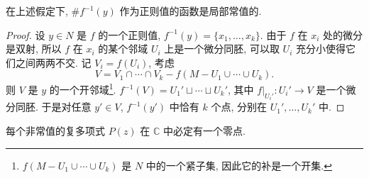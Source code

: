 \documentclass[12pt,a4paper]{article}
\begin{document}
\begin{proposition}
    在上述假定下, $\#f^{-1}(y)$ 作为正则值的函数是局部常值的.
\end{proposition}
\begin{proof}
    设 $y\in N$ 是 $f$ 的一个正则值, $f^{-1}(y) = \{x_1,\dots,x_k\}$. 由于 $f$ 在 $x_i$ 处的微分是双射, 
    所以 $f$ 在 $x_i$ 的某个邻域 $U_i$ 上是一个微分同胚, 可以取 $U_i$ 充分小使得它们之间两两不交. 
    记 $V_i = f(U_i)$, 考虑 
    \begin{equation*}
        V = V_1\cap\cdots\cap V_k - f(M-U_1\cup\cdots\cup U_k).
    \end{equation*}
    则 $V$ 是 $y$ 的一个开邻域\footnote{$f(M-U_1\cup\cdots\cup U_k)$ 是 $N$ 中的一个紧子集, 因此它的补是一个开集.}. 
    $f^{-1}(V) = U_1'\sqcup\cdots\sqcup U_k'$, 其中 $f|_{U_i'}: U_i'\to V$ 是一个微分同胚. 
    于是对任意 $y'\in V$, $f^{-1}(y')$ 中恰有 $k$ 个点, 分别在 $U_1',\dots,U_k'$ 中.
\end{proof}
\begin{theorem}[代数基本定理]
    每个非常值的复多项式 $P(z)$ 在 $\mathbb{C}$ 中必定有一个零点.
\end{theorem}
\end{document}
